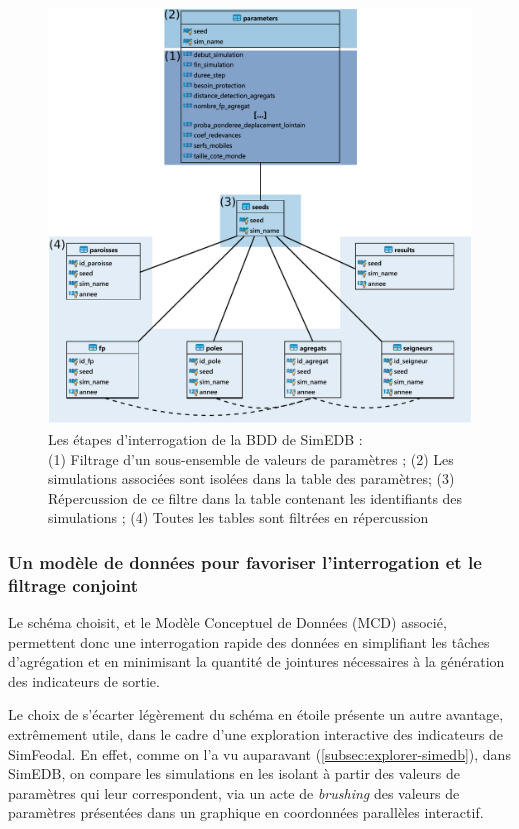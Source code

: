 \begin{figure}[H]
	\centering
	\captionsetup{width=\linewidth}
	\includegraphics[width=\linewidth]{img/MCD_SimEDB_simplified.pdf}
	\caption{Les étapes d'interrogation de la BDD de SimEDB :\\
		(1) Filtrage d'un sous-ensemble de valeurs de paramètres ;
		(2) Les simulations associées sont isolées dans la table des paramètres;
		(3) Répercussion de ce filtre dans la table contenant les identifiants des simulations ; 
		(4) Toutes les tables sont filtrées en répercussion}
	\label{fig:MCD_SimEDB_etapes}
\end{figure}
\clearpage
		\subsubsection{Un modèle de données pour favoriser l'interrogation et le filtrage conjoint}
		
		Le schéma choisit, et le Modèle Conceptuel de Données (MCD) associé, permettent donc une interrogation rapide des données en simplifiant les tâches d'agrégation et en minimisant la quantité de jointures nécessaires à la génération des indicateurs de sortie.
		
		Le choix de s'écarter légèrement du schéma en étoile présente un autre avantage, extrêmement utile, dans le cadre d'une exploration interactive des indicateurs de SimFeodal.
		En effet, comme on l'a vu auparavant (\cref{subsec:explorer-simedb}), dans SimEDB, on compare les simulations en les isolant à partir des valeurs de paramètres qui leur correspondent, via un acte de \textit{brushing} des valeurs de paramètres présentées dans un graphique en coordonnées parallèles interactif.
		
